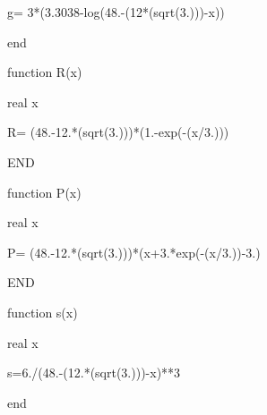       g= 3*(3.3038-log(48.-(12*(sqrt(3.)))-x))

      end



      function R(x)

      real x

      R= (48.-12.*(sqrt(3.)))*(1.-exp(-(x/3.)))

      END



      function P(x)

      real x

      P= (48.-12.*(sqrt(3.)))*(x+3.*exp(-(x/3.))-3.)

      END

      

      function s(x)

      real x

      s=6./(48.-(12.*(sqrt(3.)))-x)**3

      end



      

      

